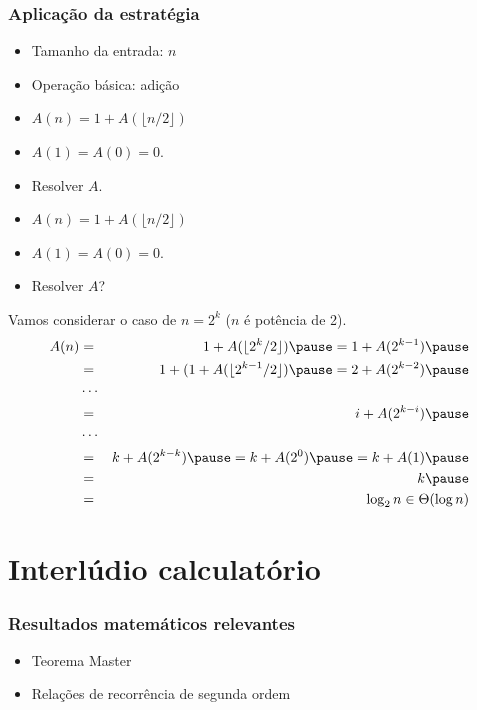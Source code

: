 \documentclass[handout]{beamer}
\begin{document}
\begin{frame}
\frametitle{Aplicação da estratégia}
\begin{small}

\end{small}
\begin{itemize}
\item Tamanho da entrada: $n$
\item Operação básica: adição
\item $A(n) = 1+A(\lfloor n/2 \rfloor)$
\item $A(1) = A(0) = 0$.
\item Resolver $A$.
\end{itemize}
\end{frame}

\begin{frame}
\begin{itemize}
\item $A(n) = 1+A(\lfloor n/2 \rfloor)$
\item $A(1) = A(0) = 0$.
\item Resolver $A$?
\end{itemize}
Vamos considerar o caso de $n = 2^k$ ($n$ é potência de 2).
\begin{eqnarray*}
A(n) & = & 1 + A (\lfloor 2^k/2 \rfloor) \pause = 1 + A (2^{k-1}) \pause \\
     & = & 1 + (1 + A(\lfloor 2^{k-1}/2 \rfloor) \pause = 2 + A(2^{k-2}) \pause \\
     & \cdots & \\
     & = & i + A(2^{k-i}) \pause \\
     & \cdots & \\
     & = & k + A(2^{k-k}) \pause = k + A(2^0) \pause = k + A(1) \pause \\
     & = & k \pause \\
     & = & \log_2 n \in \Theta(\log n) 
\end{eqnarray*}
\end{frame}

\section{Interlúdio calculatório}

\begin{frame}

\frametitle{Resultados matemáticos relevantes}

\begin{itemize}

\item Teorema Master

\item Relações de recorrência de segunda ordem
\end{itemize}

\end{frame}
\end{document}
